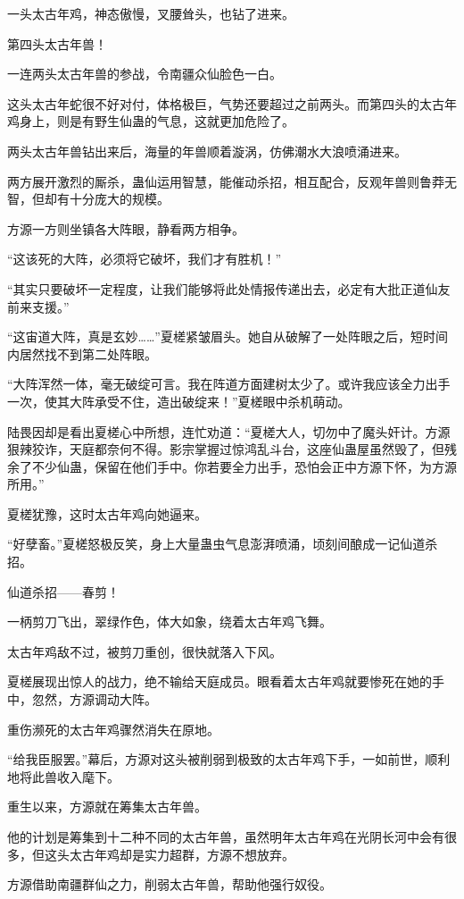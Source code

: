 \begin{this_body}
一头太古年鸡，神态傲慢，叉腰耸头，也钻了进来。

第四头太古年兽！

一连两头太古年兽的参战，令南疆众仙脸色一白。

这头太古年蛇很不好对付，体格极巨，气势还要超过之前两头。而第四头的太古年鸡身上，则是有野生仙蛊的气息，这就更加危险了。

两头太古年兽钻出来后，海量的年兽顺着漩涡，仿佛潮水大浪喷涌进来。

两方展开激烈的厮杀，蛊仙运用智慧，能催动杀招，相互配合，反观年兽则鲁莽无智，但却有十分庞大的规模。

方源一方则坐镇各大阵眼，静看两方相争。

“这该死的大阵，必须将它破坏，我们才有胜机！”

“其实只要破坏一定程度，让我们能够将此处情报传递出去，必定有大批正道仙友前来支援。”

“这宙道大阵，真是玄妙……”夏槎紧皱眉头。她自从破解了一处阵眼之后，短时间内居然找不到第二处阵眼。

“大阵浑然一体，毫无破绽可言。我在阵道方面建树太少了。或许我应该全力出手一次，使其大阵承受不住，造出破绽来！”夏槎眼中杀机萌动。

陆畏因却是看出夏槎心中所想，连忙劝道：“夏槎大人，切勿中了魔头奸计。方源狠辣狡诈，天庭都奈何不得。影宗掌握过惊鸿乱斗台，这座仙蛊屋虽然毁了，但残余了不少仙蛊，保留在他们手中。你若要全力出手，恐怕会正中方源下怀，为方源所用。”

夏槎犹豫，这时太古年鸡向她逼来。

“好孽畜。”夏槎怒极反笑，身上大量蛊虫气息澎湃喷涌，顷刻间酿成一记仙道杀招。

仙道杀招——春剪！

一柄剪刀飞出，翠绿作色，体大如象，绕着太古年鸡飞舞。

太古年鸡敌不过，被剪刀重创，很快就落入下风。

夏槎展现出惊人的战力，绝不输给天庭成员。眼看着太古年鸡就要惨死在她的手中，忽然，方源调动大阵。

重伤濒死的太古年鸡骤然消失在原地。

“给我臣服罢。”幕后，方源对这头被削弱到极致的太古年鸡下手，一如前世，顺利地将此兽收入麾下。

重生以来，方源就在筹集太古年兽。

他的计划是筹集到十二种不同的太古年兽，虽然明年太古年鸡在光阴长河中会有很多，但这头太古年鸡却是实力超群，方源不想放弃。

方源借助南疆群仙之力，削弱太古年兽，帮助他强行奴役。


\end{this_body}

